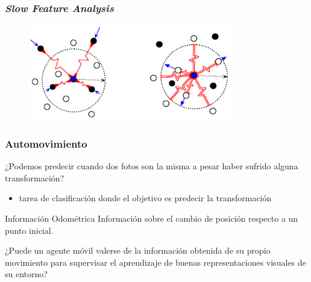 \documentclass{beamer}
\begin{document}
\begin{frame}
\frametitle{\textit{Slow Feature Analysis}}
\begin{figure}
    \centering
    \includegraphics[width=0.8\textwidth]{images/example_contrastiveloss.png}
\end{figure}
\end{frame}




\begin{frame}
\frametitle{Automovimiento}

¿Podemos predecir cuando dos fotos son la misma a pesar haber sufrido alguna transformación?\\

\vfill

\begin{itemize}
    \item tarea de clasificación donde el objetivo es predecir la transformación 
\end{itemize}

\vfill

\begin{block}{Información Odométrica}
Información sobre el cambio de posición respecto a un punto inicial.
\end{block}
\vfill

¿Puede un agente móvil valerse de la información obtenida de su propio movimiento para
supervisar el aprendizaje de buenas representaciones visuales de su
entorno?
\end{frame}
\end{document}
